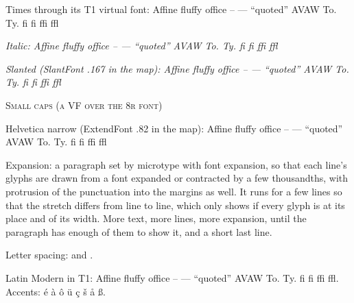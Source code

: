 \documentclass{article}
\newcommand\words{Affine fluffy office -- --- ``quoted'' AVAW To. Ty. f\/i fi ffi ffl}
\begin{document}
\selectfont
\noindent Times through its T1 virtual font: \words\par
\noindent\textit{Italic: \words}\par
\noindent\textsl{Slanted (SlantFont .167 in the map): \words}\par
\noindent\textsc{Small caps (a VF over the 8r font)}
\newpage

\selectfont
\noindent Helvetica narrow (ExtendFont .82 in the map): \words
\newpage

\selectfont
\noindent Expansion: a paragraph set by microtype with font expansion, so
that each line's glyphs are drawn from a font expanded or contracted by a
few thousandths, with protrusion of the punctuation into the margins as
well. It runs for a few lines so that the stretch differs from line to
line, which only shows if every glyph is at its place and of its width.
More text, more lines, more expansion, until the paragraph has enough of
them to show it, and a short last line.
\newpage

\noindent Letter spacing:  and .
\newpage

\selectfont
\noindent Latin Modern in T1: \words. Accents: \'e \`a \^o \"u \c{c} \v{s} \aa{} \ss.
\end{document}
